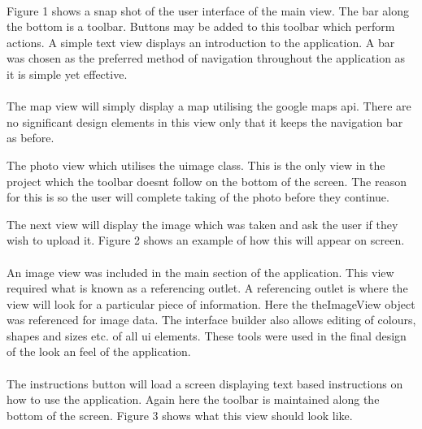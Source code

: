 \documentclass[12pt]{article}
\begin{document}
\paragraph{}

Figure 1 shows a snap shot of the user interface of the main view. The bar along the bottom is a toolbar. Buttons may be added to this toolbar which perform actions. A simple text view displays an introduction to the application. A bar was chosen as the preferred method of navigation throughout the application as it is simple yet effective.

\paragraph{}
The map view will simply display a map utilising the google maps \gls{api}. There are no significant design elements in this view only that it keeps the navigation bar as before. 

The photo view which utilises the \gls{uimage} class. This is the only view in the project which the toolbar doesnt follow on the bottom of the screen. The reason for this is so the user will complete taking of the photo before they continue. 

The next view will display the image which was taken and ask the user if they wish to upload it. Figure 2 shows an example of how this will appear on screen. 

\paragraph{}

An image view was included in the main section of the application. This view required what is known as a referencing outlet. A referencing outlet is where the view will look for a particular piece of information. Here the theImageView object was referenced for image data. The interface builder also allows editing of colours, shapes and sizes etc. of all \gls{ui} elements. These tools were used in the final design of the look an feel of the application.

\paragraph{}

The instructions button will load a screen displaying text based instructions on how to use the application. Again here the toolbar is maintained along the bottom of the screen. Figure 3 shows what this view should look like.
\end{document}
